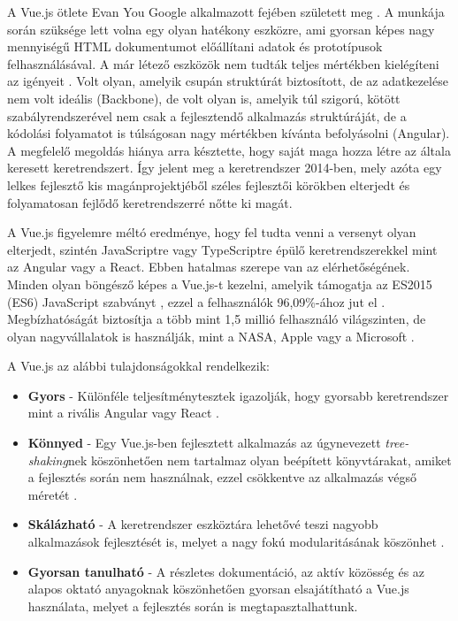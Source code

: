 \documentclass[12pt]{article}
\begin{document}
A Vue.js ötlete Evan You Google alkalmazott fejében született meg \cite{VUE_BOOK}. A munkája során szüksége lett volna egy olyan hatékony eszközre, ami gyorsan képes nagy mennyiségű HTML dokumentumot előállítani adatok és prototípusok felhasználásával. A már létező eszközök nem tudták teljes mértékben kielégíteni az igényeit \cite{VUE_BOOK}. Volt olyan, amelyik csupán struktúrát biztosított, de az adatkezelése nem volt ideális (Backbone), de volt olyan is, amelyik túl szigorú, kötött szabályrendszerével nem csak a fejlesztendő alkalmazás struktúráját, de a kódolási folyamatot is túlságosan nagy mértékben kívánta befolyásolni (Angular). A megfelelő megoldás hiánya arra késztette, hogy saját maga hozza létre az általa keresett keretrendszert. Így jelent meg a keretrendszer 2014-ben, mely azóta egy lelkes fejlesztő kis magánprojektjéből széles fejlesztői körökben elterjedt és folyamatosan fejlődő keretrendszerré nőtte ki magát.

A Vue.js figyelemre méltó eredménye, hogy fel tudta venni a versenyt olyan elterjedt, szintén JavaScriptre vagy TypeScriptre épülő keretrendszerekkel mint az Angular vagy a React. Ebben hatalmas szerepe van az elérhetőségének. Minden olyan böngésző képes a Vue.js-t kezelni, amelyik támogatja az ES2015 (ES6) JavaScript szabványt \cite{VUE_SUPP}, ezzel a felhasználók 96,09\%-ához jut el \cite{ES2015_USAGE}. Megbízhatóságát biztosítja a több mint 1,5 millió felhasználó világszinten, de olyan nagyvállalatok is használják, mint a NASA, Apple vagy a Microsoft \cite{VUE_COMPANIES}.

A Vue.js az alábbi tulajdonságokkal rendelkezik:
\begin{itemize}
	\item[]\textbf{Gyors}
	- Különféle teljesítménytesztek igazolják, hogy gyorsabb keretrendszer mint a rivális Angular vagy React \cite{FRAMEWORK_PERF}.
	\item[]\textbf{Könnyed}
	- Egy Vue.js-ben fejlesztett alkalmazás az úgynevezett \textit{tree-shaking}nek köszönhetően nem tartalmaz olyan beépített könyvtárakat, amiket a fejlesztés során nem használnak, ezzel csökkentve az alkalmazás végső méretét \cite{VUE_LW}.
	\item[]\textbf{Skálázható}
	- A keretrendszer eszköztára lehetővé teszi nagyobb alkalmazások fejlesztését is, melyet a nagy fokú modularitásának köszönhet \cite{VUE_SCALE}.
	\item[]\textbf{Gyorsan tanulható}
	- A részletes dokumentáció, az aktív közösség és az alapos oktató anyagoknak köszönhetően gyorsan elsajátítható a Vue.js használata, melyet a fejlesztés során is megtapasztalhattunk.
\end{itemize}
\end{document}

